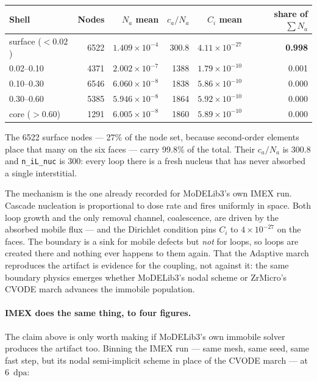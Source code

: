\documentclass[11pt,a4paper]{article}
\newcommand{\code}[1]{\texttt{\small #1}}
\newcommand{\dpa}{\ensuremath{\mathrm{dpa}}}
\begin{document}
\begin{center}
\begin{tabular}{lrrrrr}
\toprule
Shell & Nodes & $N_a$ mean & $c_a/N_a$ & $C_i$ mean & share of $\sum N_a$ \\
\midrule
surface ($<0.02$) & 6522 & $1.409\times10^{-4}$ & 300.8  & $4.11\times10^{-27}$ & \textbf{0.998} \\
0.02--0.10        & 4371 & $2.002\times10^{-7}$ & 1388   & $1.79\times10^{-10}$ & 0.001 \\
0.10--0.30        & 6546 & $6.060\times10^{-8}$ & 1838   & $5.86\times10^{-10}$ & 0.000 \\
0.30--0.60        & 5385 & $5.946\times10^{-8}$ & 1864   & $5.92\times10^{-10}$ & 0.000 \\
core ($>0.60$)    & 1291 & $6.005\times10^{-8}$ & 1860   & $5.89\times10^{-10}$ & 0.000 \\
\bottomrule
\end{tabular}
\end{center}

\noindent
The 6522 surface nodes --- 27\% of the node set, because second-order elements
place that many on the six faces --- carry 99.8\% of the total. Their
$c_a/N_a$ is 300.8 and \code{n\_iL\_nuc} is 300: every loop there is a fresh
nucleus that has never absorbed a single interstitial.

The mechanism is the one already recorded for MoDELib3's own IMEX run.
Cascade nucleation is proportional to dose rate and fires uniformly in space.
Both loop growth and the only removal channel, coalescence, are driven by the
absorbed mobile flux --- and the Dirichlet condition pins $C_i$ to
$4\times10^{-27}$ on the faces. The boundary is a sink for mobile defects but
\emph{not} for loops, so loops are created there and nothing ever happens to
them again. That the Adaptive march reproduces the artifact is evidence for the
coupling, not against it: the same boundary physics emerges whether MoDELib3's
nodal scheme or ZrMicro's CVODE march advances the immobile population.

\paragraph{IMEX does the same thing, to four figures.} The claim above
is only worth making if MoDELib3's own immobile solver produces the artifact
too. Binning the IMEX run --- same mesh, same seed, same fast step, but
its nodal semi-implicit scheme in place of the CVODE march --- at 6~\dpa:
\end{document}
